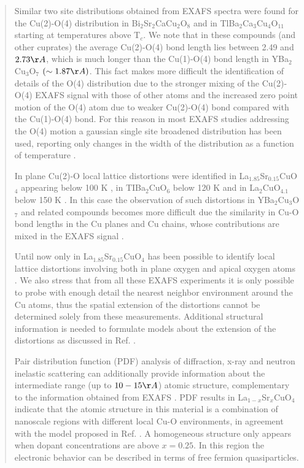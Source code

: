 \begin{quote}
Similar two site distributions obtained from EXAFS spectra were found for the Cu(2)-O(4) distribution in Bi$_{2}$Sr$_{2}$CaCu$_{2}$O$_{8}$ \cite{bianconni1992lattice} and in TlBa$_{2}$Ca$_{3}$Cu$_{4}$O$_{11}$ \cite{Allen1991} starting at temperatures above T$_{c}$. 
We note that in these compounds (and other cuprates) the average Cu(2)-O(4) bond length lies between 2.49 and $2.73 \AA$, which is much longer than the Cu(1)-O(4) bond length in YBa$_{2}$Cu$_{3}$O$_{7}$ $(\sim 1.87 \AA)$. 
This fact makes more difficult the identification of details of the O(4) distribution due to the stronger mixing of the Cu(2)-O(4) EXAFS signal with those of other atoms and the increased zero point motion of the O(4) atom due to weaker Cu(2)-O(4) bond compared with the Cu(1)-O(4) bond.
For this reason in most EXAFS studies addressing the O(4) motion a gaussian single site broadened distribution has been used, reporting only changes in the width of the distribution as a function of temperature \cite{Booth1995,Oyanagi2007,Zhang2009}.

In plane  Cu(2)-O local lattice distortions were identified in La$_{1.85}$Sr$_{0.15}$CuO$_{4}$ appearing below 100 K \cite{Bianconi1996,Oyanagi2007},  in TIBa$_{2}$CuO$_{6}$ below 120 K \cite{Conradson1997} and in La$_{2}$CuO$_{4.1}$ below 150 K \cite{Lanzara1997,MustredeLeon:xj5003}. 
In this case the observation of such distortions in YBa$_{2}$Cu$_{3}$O$_{7}$ and related compounds becomes more difficult due the similarity  in Cu-O bond lengths in the Cu planes and Cu chains, whose contributions are mixed in the EXAFS signal \cite{Conradson1997,MustredeLeon1992a}.

Until now only in La$_{1.85}$Sr$_{0.15}$CuO$_{4}$ has been possible to identify local lattice distortions involving both in plane oxygen and apical oxygen atoms  \cite{Bianconi1996}. 
We also stress that from all these EXAFS experiments it is only possible to probe with enough detail the nearest neighbor environment around the Cu atoms, thus the spatial extension of the distortions cannot be determined solely from these measurements. 
Additional structural information \cite{Bianconi1996a} is needed to formulate models about the extension of the distortions as discussed in Ref. \cite{Bianconi1996}.

Pair distribution function (PDF) analysis of diffraction, x-ray and neutron inelastic scattering can additionally provide information about the intermediate range (up to $10-15 \AA$)  atomic structure, complementary to the information obtained from EXAFS \cite{Egami2003}. 
PDF results in La$_{1-x}$Sr$_{x}$CuO$_{4}$ \cite{Bozin1999,Bozin2000} indicate that the atomic structure in this material is a combination of nanoscale regions with different local Cu-O environments, in agreement with the model proposed in Ref. \cite{Bianconi1996}. 
A homogeneous structure only appears when dopant concentrations are above $x = 0.25$. 
In this region the electronic behavior can be described in terms of free fermion quasiparticles.


\end{quote}
